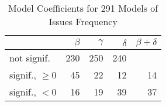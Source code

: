 
\begin{table}[t] \centering
\small
  \caption{Model Coefficients for 291 Models of Issues Frequency}
  \label{Table:rddmodels_issues}
\begin{tabular}{ l  r r r r }        
\hline 

 & $\beta$ & $\gamma$ & $\delta$ & $\beta + \delta$ \\ 
 \hline 
 \hline
not signif. & 230 & 250 & 240 & \\
\hline
signif., $\ge 0$ & 45 & 22 & 12 & 14 \\
\hline
signif., $<0$ & 16 & 19 & 39 & 37 \\
\hline
\end{tabular}
\end{table}